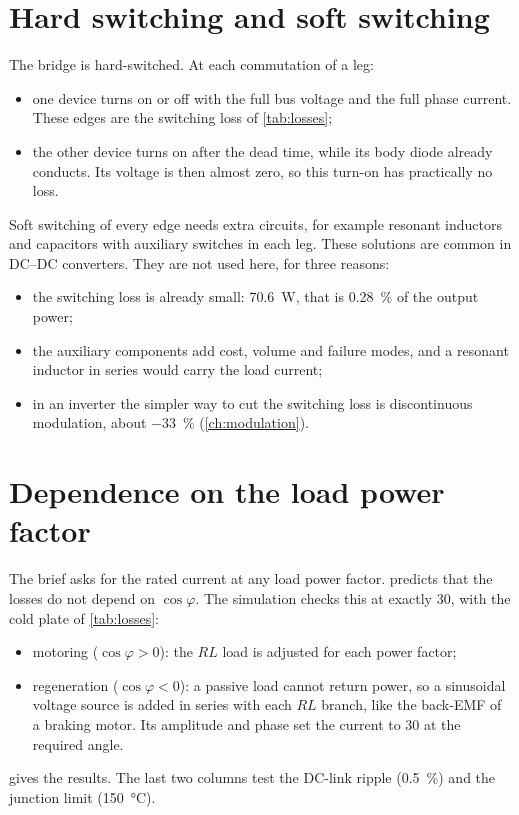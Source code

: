 \section{Hard switching and soft switching}

The bridge is hard-switched. At each commutation of a leg:
\begin{itemize}
  \item one device turns on or off with the full bus voltage and the full
        phase current. These edges are the switching loss of
        \cref{tab:losses};
  \item the other device turns on after the dead time, while its body diode
        already conducts. Its voltage is then almost zero, so this turn-on
        has practically no loss.
\end{itemize}
Soft switching of every edge needs extra circuits, for example resonant
inductors and capacitors with auxiliary switches in each leg. These
solutions are common in DC--DC converters. They are not used here, for three
reasons:
\begin{itemize}
  \item the switching loss is already small: \SI{70.6}{\watt}, that is
        \SI{0.28}{\percent} of the output power;
  \item the auxiliary components add cost, volume and failure modes, and a
        resonant inductor in series would carry the load current;
  \item in an inverter the simpler way to cut the switching loss is
        discontinuous modulation, about \SI{-33}{\percent}
        (\cref{ch:modulation}).
\end{itemize}

\section{Dependence on the load power factor}
\label{sec:pfsweep}

The brief asks for the rated current at any load power factor.
 predicts that the losses do not depend on $\cos\varphi$. The
simulation checks this at exactly \SI{30}{\Arms}, with the cold plate of
\cref{tab:losses}:
\begin{itemize}
  \item motoring ($\cos\varphi > 0$): the $RL$ load is adjusted for each
        power factor;
  \item regeneration ($\cos\varphi < 0$): a passive load cannot return
        power, so a sinusoidal voltage source is added in series with each
        $RL$ branch, like the back-EMF of a braking motor. Its amplitude and
        phase set the current to \SI{30}{\Arms} at the required angle.
\end{itemize}
 gives the results. The last two columns test the
DC-link ripple (\SI{0.5}{\percent}) and the junction limit
(\SI{150}{\celsius}).

